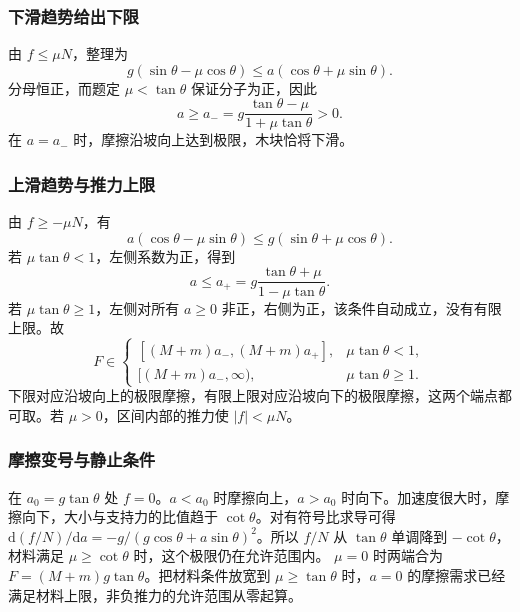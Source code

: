 \documentclass[UTF8,fontset=fandol,a4paper,11pt]{ctexart}
\begin{document}
\subsubsection*{下滑趋势给出下限}
由 $f\leq\mu N$，整理为
\[
g(\sin\theta-\mu\cos\theta)
\leq a(\cos\theta+\mu\sin\theta).
\]
分母恒正，而题定 $\mu<\tan\theta$ 保证分子为正，因此
\[
\boxed{a\geq a_-=g\frac{\tan\theta-\mu}{1+\mu\tan\theta}>0}.
\]
在 $a=a_-$ 时，摩擦沿坡向上达到极限，木块恰将下滑。

\subsubsection*{上滑趋势与推力上限}
由 $f\geq-\mu N$，有
\[
a(\cos\theta-\mu\sin\theta)
\leq g(\sin\theta+\mu\cos\theta).
\]
若 $\mu\tan\theta<1$，左侧系数为正，得到
\[
a\leq a_+=g\frac{\tan\theta+\mu}{1-\mu\tan\theta}.
\]
若 $\mu\tan\theta\geq1$，左侧对所有 $a\geq0$ 非正，右侧为正，该条件自动成立，没有有限上限。故
\[
\boxed{F\in\begin{cases}
[(M+m)a_-,(M+m)a_+],&\mu\tan\theta<1,\\
[(M+m)a_-,\infty),&\mu\tan\theta\geq1.
\end{cases}}
\]
下限对应沿坡向上的极限摩擦，有限上限对应沿坡向下的极限摩擦，这两个端点都可取。若 $\mu>0$，区间内部的推力使 $|f|<\mu N$。

\subsubsection*{摩擦变号与静止条件}
在 $a_0=g\tan\theta$ 处 $f=0$。$a<a_0$ 时摩擦向上，$a>a_0$ 时向下。加速度很大时，摩擦向下，大小与支持力的比值趋于 $\cot\theta$。对有符号比求导可得 $\mathrm d(f/N)/\mathrm da=-g/(g\cos\theta+a\sin\theta)^2$。所以 $f/N$ 从 $\tan\theta$ 单调降到 $-\cot\theta$，材料满足 $\mu\geq\cot\theta$ 时，这个极限仍在允许范围内。
$\mu=0$ 时两端合为 $F=(M+m)g\tan\theta$。把材料条件放宽到 $\mu\geq\tan\theta$ 时，$a=0$ 的摩擦需求已经满足材料上限，非负推力的允许范围从零起算。
\end{document}
